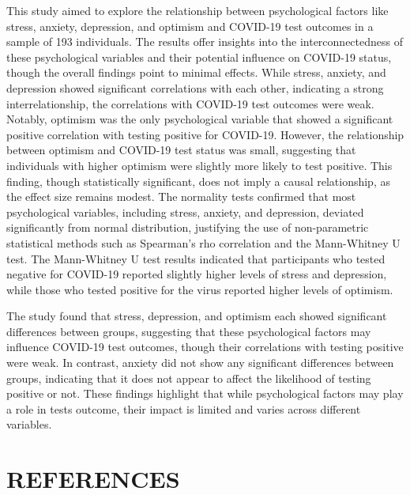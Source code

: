\documentclass[a4paper]{article}
\begin{document}
\noindent
This study aimed to explore the relationship between psychological factors like stress, anxiety, depression, and optimism and COVID-19 test outcomes in a sample of 193 individuals.\newline
The results offer insights into the interconnectedness of these psychological variables and their potential influence on COVID-19 status, though the overall findings point to minimal effects.
\vspace{0.5em}\newline
While stress, anxiety, and depression showed significant correlations with each other, indicating a strong interrelationship, the correlations with COVID-19 test outcomes were weak.
Notably, optimism was the only psychological variable that showed a significant positive correlation with testing positive for COVID-19.
\vspace{0.5em}\newline
However, the relationship between optimism and COVID-19 test status was small, suggesting that individuals with higher optimism were slightly more likely to test positive.
This finding, though statistically significant, does not imply a causal relationship, as the effect size remains modest.
\vspace{0.5em}\newline
The normality tests confirmed that most psychological variables, including stress, anxiety, and depression, deviated significantly from normal distribution,
justifying the use of non-parametric statistical methods such as Spearman’s rho correlation and the Mann-Whitney U test.
The Mann-Whitney U test results indicated that participants who tested negative for COVID-19 reported slightly higher levels of stress and depression,
while those who tested positive for the virus reported higher levels of optimism.
\vspace{0.5em}\newline

The study found that stress, depression, and optimism each showed significant differences between groups,
suggesting that these psychological factors may influence COVID-19 test outcomes, though their correlations with testing positive were weak.
In contrast, anxiety did not show any significant differences between groups,
indicating that it does not appear to affect the likelihood of testing positive or not.
These findings highlight that while psychological factors may play a role in tests outcome, their impact is limited and varies across different variables.
\newpage
\section{REFERENCES}



\end{document}
